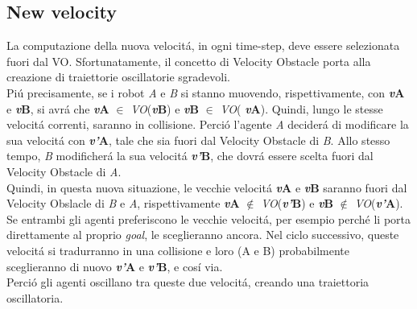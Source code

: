 \subsection{New velocity}
La computazione della nuova velocit\'a, in ogni time-step, deve essere selezionata fuori dal VO.
 Sfortunatamente, il concetto di Velocity Obstacle porta alla creazione di traiettorie oscillatorie sgradevoli.
 \\Pi\'u precisamente, se i robot \textit{A} e \textit{B} si stanno muovendo, rispettivamente, con {\bfseries\textit{v}\ped A} e {\bfseries\textit{v}\ped B}, si avr\'a che {\bfseries\textit{v}\ped A} $\in$ {\textit{VO}}({\bfseries\textit{v}\ped B}) e {\bfseries\textit{v}\ped B} $\in$ {\textit{VO}}( {\bfseries\textit{v}\ped A}).
 Quindi, lungo le stesse velocit\'a correnti, saranno in collisione. Perci\'o l'agente \textit{A} decider\'a di modificare la sua velocit\'a con {\bfseries\textit{v'}\ped A}, tale che sia fuori dal Velocity Obstacle di \textit{B}. Allo stesso tempo, \textit{B} modificher\'a la sua velocit\'a {\bfseries\textit{v'}\ped B}, che dovr\'a essere scelta fuori dal Velocity Obstacle di \textit{A}.
 \\Quindi, in questa nuova situazione, le vecchie velocit\'a {\bfseries\textit{v}\ped A} e {\bfseries\textit{v}\ped B} saranno fuori dal Velocity Obslacle di \textit{B} e \textit{A}, rispettivamente  {\bfseries\textit{v}\ped A} $\notin$ {\textit{VO}}({\bfseries\textit{v'}\ped B}) e  {\bfseries\textit{v}\ped B} $\notin$ {\textit{VO}}({\bfseries\textit{v'}\ped A}).
 Se entrambi gli agenti preferiscono le vecchie velocit\'a, per esempio perch\'e li porta direttamente al proprio \textit{goal}, le sceglieranno ancora. Nel ciclo successivo, queste velocit\'a si tradurranno in una collisione e loro (A e B) probabilmente sceglieranno di nuovo {\bfseries\textit{v'}\ped A} e {\bfseries\textit{v'}\ped B}, e cos\'i via.
\\Perci\'o gli agenti oscillano tra queste due velocit\'a, creando una traiettoria oscillatoria.

